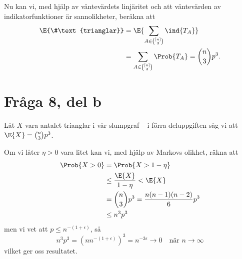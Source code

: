 \documentclass[nobib]{tufte-handout}
\begin{document}
Nu kan vi, med hjälp av väntevärdets linjäritet och att väntevärden av indikatorfunktioner är sannolikheter, beräkna att
\begin{align*}
  \E{\#\text{trianglar}} &= \E{\sum_{A \in \binom{[n]}{3}} \ind{T_A}}\\
  &= \sum_{A \in \binom{[n]}{3}} \Prob{T_A} = \binom{n}{3}p^3.
\end{align*}

\section{Fråga 8, del b}

Låt $X$ vara antalet trianglar i vår slumpgraf -- i förra deluppgiften såg vi att $\E{X} = \binom{n}{3}p^3$.

Om vi låter $\eta > 0$ vara litet kan vi, med hjälp av Markovs olikhet, räkna att
\begin{align*}
  \Prob{X > 0} &= \Prob{X > 1 - \eta}\\
  &\leq \frac{\E{X}}{1 - \eta} < \E{X}\\
  &= \binom{n}{3}p^3 = \frac{n(n-1)(n-2)}{6}p^3\\
  &\leq n^3 p^3
\end{align*}
men vi vet att $p \leq n^{-(1+\epsilon)}$, så
$$n^3p^3 = (n n^{-(1+\epsilon)})^3 = n^{-3\epsilon} \to 0\quad\text{när } n\to\infty$$
vilket ger oss resultatet.

%
%
\end{document}

